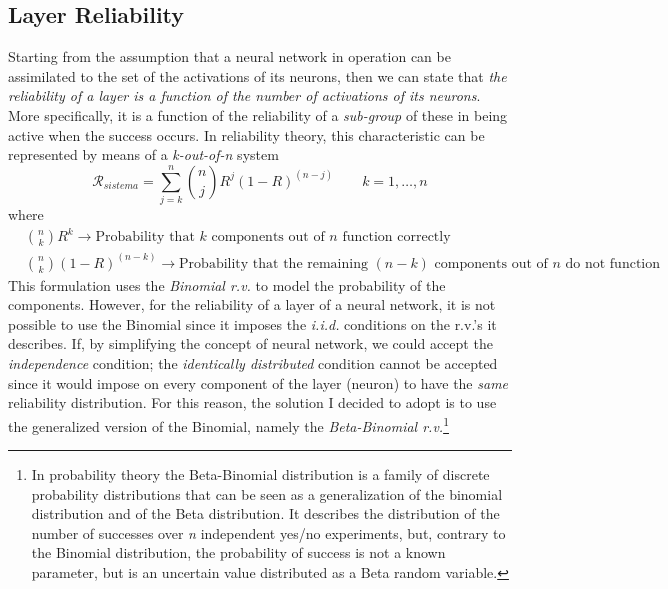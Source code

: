 \documentclass[10pt]{article} %
\begin{document}
\subsection{Layer Reliability}
Starting from the assumption that a neural network in operation can be assimilated to the set of the activations of its neurons, then we can state that \textit{the reliability of a layer is a function of the number of activations of its neurons}. More specifically, it is a function of the reliability of a \textit{sub-group} of these in being active when the success occurs.
In reliability theory, this characteristic can be represented by means of a \textit{k-out-of-n} system
\begin{equation}
    \mathcal{R}_{sistema} = \sum_{j=k}^{n}\binom{n}{j} R^{j}(1-R)^{(n-j)} \qquad k=1,\dots, n
\end{equation}
where 
\begin{align}
    &\binom{n}{k} R^{k} \longrightarrow \text{Probability that $k$ components out of $n$ function correctly} \\
    &\binom{n}{k} (1-R)^{(n-k)} \longrightarrow \text{Probability that the remaining $(n-k)$ components out of $n$ do not function}
\end{align}
This formulation uses the \textit{Binomial r.v.} to model the probability of the components. However, for the reliability of a layer of a neural network, it is not possible to use the Binomial since it imposes the \textit{i.i.d.} conditions on the r.v.'s it describes. If, by simplifying the concept of neural network, we could accept the \textit{independence} condition; the \textit{identically distributed} condition cannot be accepted since it would impose on every component of the layer (neuron) to have the \textit{same} reliability distribution.
For this reason, the solution I decided to adopt is to use the generalized version of the Binomial, namely the \textit{Beta-Binomial r.v.}\footnote{In probability theory the Beta-Binomial distribution is a family of discrete probability distributions that can be seen as a generalization of the binomial distribution and of the Beta distribution. It describes the distribution of the number of successes over \textit{n} independent yes/no experiments, but, contrary to the Binomial distribution, the probability of success is not a known parameter, but is an uncertain value distributed as a Beta random variable.}
\end{document}
